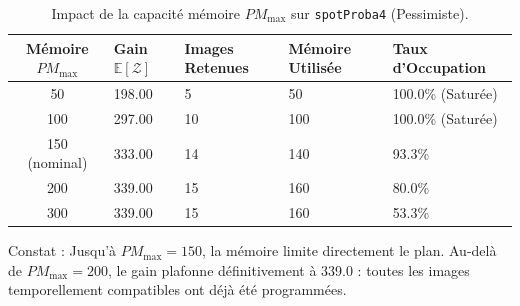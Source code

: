 \begin{table}[H]
\centering
\small
\begin{tabularx}{\textwidth}{cXXXX}
\toprule
\textbf{Mémoire $PM_{\max}$} & \textbf{Gain $\mathbb{E}[\mathcal{Z}]$} & \textbf{Images Retenues} & \textbf{Mémoire Utilisée} & \textbf{Taux d'Occupation} \\
\midrule
50 & 198.00 & 5 & 50 & 100.0\% (Saturée) \\
100 & 297.00 & 10 & 100 & 100.0\% (Saturée) \\
150 (nominal) & 333.00 & 14 & 140 & 93.3\% \\
200 & 339.00 & 15 & 160 & 80.0\% \\
300 & 339.00 & 15 & 160 & 53.3\% \\
\bottomrule
\end{tabularx}
\caption{Impact de la capacité mémoire $PM_{\max}$ sur \texttt{spotProba4} (Pessimiste).}
\label{tab:sensi_pm}
\end{table}

Constat : Jusqu'à $PM_{\max}=150$, la mémoire limite directement le plan. Au-delà de $PM_{\max}=200$, le gain plafonne définitivement à 339.0 : toutes les images temporellement compatibles ont déjà été programmées.
